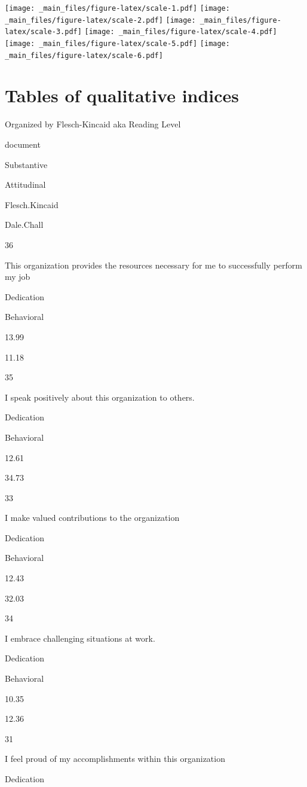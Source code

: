 \documentclass[
]{book}
\begin{document}
\texttt{[image: \_main\_files/figure-latex/scale-1.pdf]} \texttt{[image: \_main\_files/figure-latex/scale-2.pdf]} \texttt{[image: \_main\_files/figure-latex/scale-3.pdf]} \texttt{[image: \_main\_files/figure-latex/scale-4.pdf]} \texttt{[image: \_main\_files/figure-latex/scale-5.pdf]} \texttt{[image: \_main\_files/figure-latex/scale-6.pdf]}

\hypertarget{tables-of-qualitative-indices}{%
\section{Tables of qualitative indices}\label{tables-of-qualitative-indices}}

\label{tab:freqtables}Organized by Flesch-Kincaid aka Reading Level

document

Substantive

Attitudinal

Flesch.Kincaid

Dale.Chall

36

This organization provides the resources necessary for me to successfully perform my job

Dedication

Behavioral

13.99

11.18

35

I speak positively about this organization to others.

Dedication

Behavioral

12.61

34.73

33

I make valued contributions to the organization

Dedication

Behavioral

12.43

32.03

34

I embrace challenging situations at work.

Dedication

Behavioral

10.35

12.36

31

I feel proud of my accomplishments within this organization

Dedication
\end{document}
